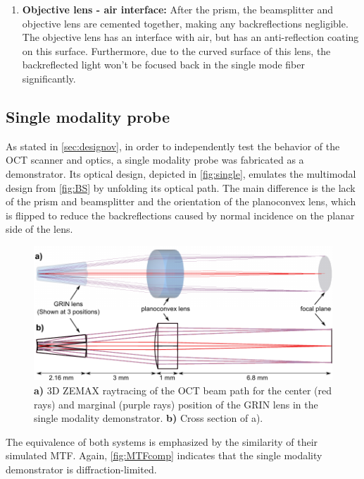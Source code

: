 \begin{enumerate}
\item \textbf{Objective lens - air interface:} After the prism, the beamsplitter and objective lens are cemented together, making any backreflections negligible. The objective lens has an interface with air, but has an anti-reflection coating on this surface. Furthermore, due to the curved surface of this lens, the backreflected light won't be focused back in the single mode fiber significantly.
\end{enumerate}


\subsection{Single modality probe}
As stated in \autoref{sec:designov}, in order to independently test the behavior of the OCT scanner and optics, a single modality probe was fabricated as a demonstrator. Its optical design, depicted in \autoref{fig:single}, emulates the multimodal design from \autoref{fig:BS} by unfolding its optical path. The main difference is the lack of the prism and beamsplitter and the orientation of the planoconvex lens, which is flipped to reduce the backreflections caused by normal incidence on the planar side of the lens.

\begin{figure}[h!]\centering
      \includegraphics[width=12cm]{figures/30_DesignSimulation/Optical/singleAll.pdf}
      \caption{\textbf{a)} 3D ZEMAX raytracing of the OCT beam path for the center (red rays) and marginal (purple rays) position of the GRIN lens in the single modality demonstrator.
      \textbf{b)} Cross section of a).}
      \label{fig:single}
\end{figure}

The equivalence of both systems is emphasized by the similarity of their simulated MTF. Again, \autoref{fig:MTFcomp} indicates that the single modality demonstrator is diffraction-limited.

